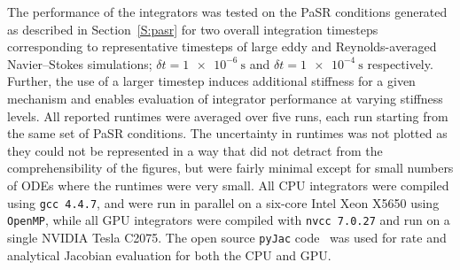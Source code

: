 \documentclass[preprint]{elsarticle}
\begin{document}
The performance of the integrators was tested on the PaSR conditions generated as described in Section~\ref{S:pasr} for two overall integration timesteps corresponding to representative timesteps of large eddy and Reynolds-averaged Navier--Stokes simulations; $\delta t = \SI{1e-6}{\s}$ and $\delta t = \SI{1e-4}{\s}$ respectively.
Further, the use of a larger timestep induces additional stiffness for a given mechanism and enables evaluation of integrator performance at varying stiffness levels.
All reported runtimes were averaged over five runs, each run starting from the same set of PaSR conditions.
The uncertainty in runtimes was not plotted as they could not be represented in a way that did not detract from the comprehensibility of the figures, but were fairly minimal except for small numbers of ODEs where the runtimes were very small.
All CPU integrators were compiled using \texttt{gcc 4.4.7}, and were run in parallel on a six-core Intel Xeon X5650 using \texttt{OpenMP}, while all GPU integrators were compiled with \texttt{nvcc 7.0.27} and run on a single NVIDIA Tesla C2075.
The open source \texttt{pyJac} code~\cite{Niemeyer:2015im,Niemeyer:2015ws} was used for rate and analytical Jacobian evaluation for both the CPU and GPU.
\end{document}
